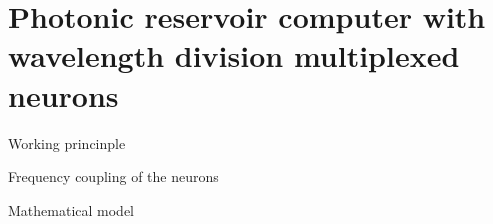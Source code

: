 \section[Photonic RC with frequency multiplexed neurons]{Photonic reservoir computer with wavelength division multiplexed neurons}

\begin{frame}{Working princinple}
	
\end{frame}

\begin{frame}{Frequency coupling of the neurons}
	
\end{frame}

\begin{frame}{Mathematical model}
	
\end{frame}